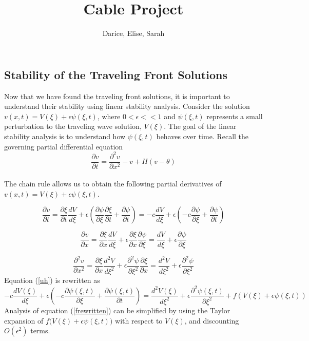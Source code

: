 \documentclass[12pt]{article}
\title{Cable Project}
\author{Darice, Elise, Sarah}
\begin{document}
\maketitle

\subsection{Stability of the Traveling Front Solutions}
Now that we have found the traveling front solutions, it is important to understand their stability using linear stability analysis. Consider the solution $v(x,t)=V(\xi)+\epsilon\psi(\xi,t)$, where $0 < \epsilon <<1$ and $\psi(\xi,t)$ represents a small perturbation to the traveling wave solution, $V(\xi)$. The goal of the linear stability analysis is to understand how $\psi(\xi,t)$ behaves over time. Recall the governing partial differential equation
\begin{equation}
\label{uh}
\frac{\partial v}{\partial t}=\frac{\partial ^2 v}{\partial x^2}-v+H(v-\theta)
\end{equation}
\\
The chain rule allows us to obtain the following partial derivatives of $v(x,t)=V(\xi)+\epsilon\psi(\xi,t)$.

$$\frac{\partial v}{\partial t}=\frac{\partial\xi}{\partial t}\frac{dV}{d\xi}+\epsilon(\frac{\partial \psi}{\partial \xi}\frac{\partial \xi}{\partial t}+\frac{\partial \psi}{\partial t}) = -c\frac{dV}{d\xi}+\epsilon(-c\frac{\partial \psi}{\partial \xi}+\frac{\partial \psi}{\partial t})$$

$$\frac{\partial v}{\partial x}=\frac{\partial \xi}{\partial x}\frac{dV}{d\xi}+\epsilon\frac{\partial\xi}{\partial x}\frac{\partial\psi}{\partial\xi} = \frac{dV}{d\xi}+\epsilon\frac{\partial\psi}{\partial\xi}$$

$$\frac{\partial^2 v}{\partial x^2}=\frac{\partial \xi}{\partial x}\frac{d^2V}{d\xi^2}+\epsilon\frac{\partial^2\psi}{\partial\xi^2}\frac{\partial \xi}{\partial x} = \frac{d^2V}{d\xi^2}+\epsilon\frac{\partial^2\psi}{\partial\xi^2}$$
Equation (\ref{uh}) is rewritten as 
\begin{equation}
\label{frewritten}
-c\frac{dV(\xi)}{d\xi}+\epsilon(-c\frac{\partial \psi(\xi,t)}{\partial \xi}+\frac{\partial \psi(\xi,t)}{\partial t})=\frac{d^2V(\xi)}{d\xi^2}+\epsilon\frac{\partial^2\psi(\xi,t)}{\partial\xi^2}+f(V(\xi)+\epsilon\psi(\xi,t))
\end{equation}
Analysis of equation (\ref{frewritten}) can be simplified by using the Taylor expansion of $f\big(V(\xi)+\epsilon\psi(\xi,t)\big)$ with respect to $V(\xi)$, and discounting $O(\epsilon ^2)$ terms.
\end{document}
